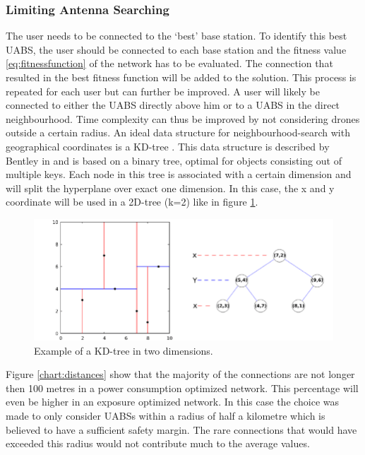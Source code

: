 \subsubsection{Limiting Antenna Searching}
The user needs to be connected to the `best' base station. To identify this best \gls{UABS}, the user should be connected 
to each base station and the fitness value \ref{eq:fitnessfunction} of the network has to be evaluated. 
The connection that resulted in the best fitness function
will be added to the solution. This process is repeated for each user but can further be improved. 
A user will likely be connected to either the
\gls{UABS} directly above him or to a \gls{UABS} in the direct neighbourhood. 
Time complexity can thus be improved by not considering drones outside a certain radius.
An ideal data structure for neighbourhood-search with geographical coordinates is a KD-tree \cite{J27,J28}. 
This data structure  is described by Bentley in \cite{J29}  and is based on a binary tree, optimal for objects consisting out of 
multiple keys.
Each node in this tree is associated with a certain dimension and will split the hyperplane over exact one dimension.
In this case, the x and y coordinate will be used in a 2D-tree (k=2) like in figure \ref{fig:exampleKDtree}.

\begin{figure}[]
  \centering
  \includegraphics[width=\textwidth/10*9]{../images/Example-of-a-2D-k-d-tree.png}
  \caption{Example of a KD-tree in two dimensions.}
  \label{fig:exampleKDtree}
\end{figure}

Figure \ref{chart:distances} show that the majority of the connections are not longer then 100 metres in a power consumption 
optimized network. This percentage will even be higher in  an exposure optimized network.
In this case the choice was made to only consider \gls{UABS}s within a radius of half a kilometre which is believed 
to have a sufficient safety margin. The rare connections that would have exceeded this radius would not contribute much to 
the average values.

